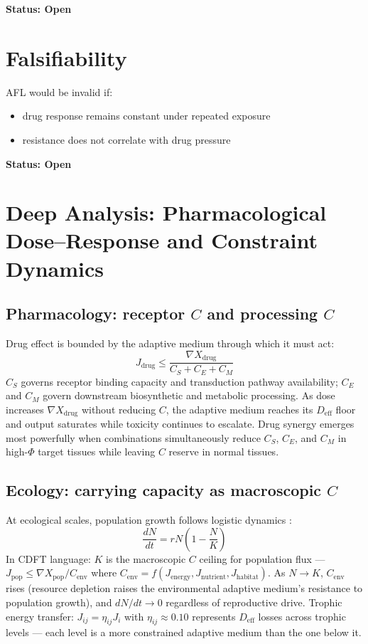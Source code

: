 \documentclass[11pt]{article}
\begin{document}
\textbf{Status: Open}

\section{Falsifiability}

AFL would be invalid if:

\begin{itemize}
    \item drug response remains constant under repeated exposure
    \item resistance does not correlate with drug pressure
\end{itemize}

\textbf{Status: Open}


\section{Deep Analysis: Pharmacological Dose--Response and Constraint Dynamics}
\subsection{Pharmacology: receptor $C$ and processing $C$}

Drug effect is bounded by the adaptive medium through which it must act:
\begin{equation}
J_{\mathrm{drug}} \leq \frac{\nabla X_{\mathrm{drug}}}{C_S + C_E + C_M}
\end{equation}
$C_S$ governs receptor binding capacity and transduction pathway availability; $C_E$ and $C_M$ govern downstream biosynthetic and metabolic processing. As dose increases $\nabla X_{\mathrm{drug}}$ without reducing $C$, the adaptive medium reaches its $D_{\mathrm{eff}}$ floor and output saturates while toxicity continues to escalate. Drug synergy emerges most powerfully when combinations simultaneously reduce $C_S$, $C_E$, and $C_M$ in high-$\Phi$ target tissues while leaving $C$ reserve in normal tissues.

\subsection{Ecology: carrying capacity as macroscopic $C$}

At ecological scales, population growth follows logistic dynamics \citep{may1976}:
\begin{equation}
\frac{dN}{dt} = rN\left(1 - \frac{N}{K}\right)
\end{equation}
In CDFT language: $K$ is the macroscopic $C$ ceiling for population flux --- $J_{\mathrm{pop}} \leq \nabla X_{\mathrm{pop}} / C_{\mathrm{env}}$ where $C_{\mathrm{env}} = f(J_{\mathrm{energy}}, J_{\mathrm{nutrient}}, J_{\mathrm{habitat}})$. As $N \to K$, $C_{\mathrm{env}}$ rises (resource depletion raises the environmental adaptive medium's resistance to population growth), and $dN/dt \to 0$ regardless of reproductive drive. Trophic energy transfer: $J_{ij} = \eta_{ij} J_i$ with $\eta_{ij} \approx 0.10$ represents $D_{\mathrm{eff}}$ losses across trophic levels --- each level is a more constrained adaptive medium than the one below it.
\end{document}
